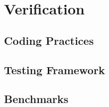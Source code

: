 \section{Verification}
%

%


\subsection{Coding Practices}
\subsection{Testing Framework}
\subsection{Benchmarks}
